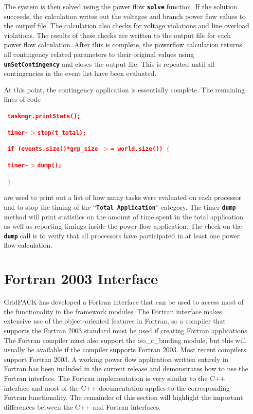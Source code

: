 \documentclass[12pt]{report} %
\begin{document}
The system is then solved using the power flow \texttt{\textbf{solve}} function. If the solution succeeds, the calculation writes out the voltages and branch power flow values to the outpuf file. The calculation also checks for voltage violations and line overload violations. The results of these checks are written to the output file for each power flow calculation. After this is complete, the powerflow calculation returns all contingency related parameters to their original values using \texttt{\textbf{unSetContingency}} and closes the output file. This is repeated until all contingencies in the event list have been evaluated.

At this point, the contingency application is essentially complete. The remaining lines of code

\textcolor{red}{\texttt{\textbf{  taskmgr.printStats();}}}

\textcolor{red}{\texttt{\textbf{  timer-$\boldsymbol{\mathrm{>}}$stop(t\_total);}}}

\textcolor{red}{\texttt{\textbf{  if (events.size()*grp\_size $\boldsymbol{\mathrm{>}}$= world.size()) $\boldsymbol{\mathrm{\{}}$}}}

\textcolor{red}{\texttt{\textbf{    timer-$\boldsymbol{\mathrm{>}}$dump();}}}

\textcolor{red}{\texttt{\textbf{  $\boldsymbol{\mathrm{\}}}$}}}

are used to print out a list of how many tasks were evaluated on each processor and to stop the timing of the ``\texttt{\textbf{Total Application}}'' category. The timer \texttt{\textbf{dump}} method will print statistics on the amount of time spent in the total application as well as reporting timings inside the power flow application. The check on the \texttt{\textbf{dump}} call is to verify that all processors have participated in at least one power flow calculation.

\section{Fortran 2003 Interface}

GridPACK has developed a Fortran interface that can be used to access most of the functionality in the framework modules. The Fortran interface makes extensive use of the object-oriented features in Fortran, so a compiler that supports the Fortran 2003 standard must be used if creating Fortran applications. The Fortran compiler must also support the iso\_c\_binding module, but this will usually be available if the compiler supports Fortran 2003. Most recent compilers support Fortran 2003. A working power flow application written entirely in Fortran has been included in the current release and demonstrates how to use the Fortran interface. The Fortran implementation is very similar to the C++ interface and most of the C++ documentation applies to the corresponding Fortran functionality. The remainder of this section will highlight the important differences between the C++ and Fortran interfaces.
\end{document}
